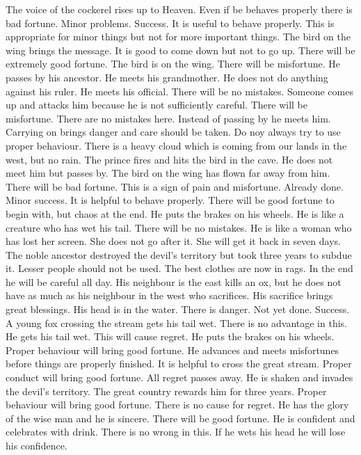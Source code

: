 	{The voice of the cockerel rises up to Heaven. Even if be behaves properly there is bad fortune.}
\or {}
	{Minor problems. Success. It is useful to behave properly. This is appropriate for minor things but not
		for more important things. The bird on the wing brings the message. It is good to come down but
		not to go up. There will be extremely good fortune.}
	{The bird is on the wing. There will be misfortune.}
	{He passes by his ancestor. He meets his grandmother. He does not do anything against his ruler.
		He meets his official. There will be no mistakes.}
	{Someone comes up and attacks him because he is not sufficiently careful. There will be misfortune.}
	{There are no mistakes here. Instead of passing by he meets him. Carrying on brings danger and care
		should be taken. Do noy always try to use proper behaviour.}
	{There is a heavy cloud which is coming from our lands in the west, but no rain. The prince fires and
		hits the bird in the cave.}
	{He does not meet him but passes by. The bird on the wing has flown far away from him. There will be
		bad fortune. This is a sign of pain and misfortune.}
\or {}
	{Already done. Minor success. It is helpful to behave properly. There will be good fortune to begin with,
		but chaos at the end.}
	{He puts the brakes on his wheels. He is like a creature who has wet his tail. There will be no mistakes.}
	{He is like a woman who has lost her screen. She does not go after it. She will get it back in seven days.}
	{The noble ancestor destroyed the devil's territory but took three years to subdue it. Lesser people
		should not be used.}
	{The best clothes are now in rags. In the end he will be careful all day.}
	{His neighbour is the east kills an ox, but he does not have as much as his neighbour in the west who
		sacrifices. His sacrifice brings great blessings.}
	{His head is in the water. There is danger.}
\or {}
	{Not yet done. Success. A young fox crossing the stream gets his tail wet. There is no advantage in this.}
	{He gets his tail wet. This will cause regret.}
	{He puts the brakes on his wheels. Proper behaviour will bring good fortune.}
	{He advances and meets misfortunes before things are properly finished. It is helpful to cross
		the great stream.}
	{Proper conduct will bring good fortune. All regret passes away. He is shaken and invades the devil's
		territory. The great country rewards him for three years.}
	{Proper behaviour will bring good fortune. There is no cause for regret. He has the glory of the
		wise man and he is sincere. There will be good fortune.}
	{He is confident and celebrates with drink. There is no wrong in this. If he wets his head he will
		lose his confidence.}
\fi

